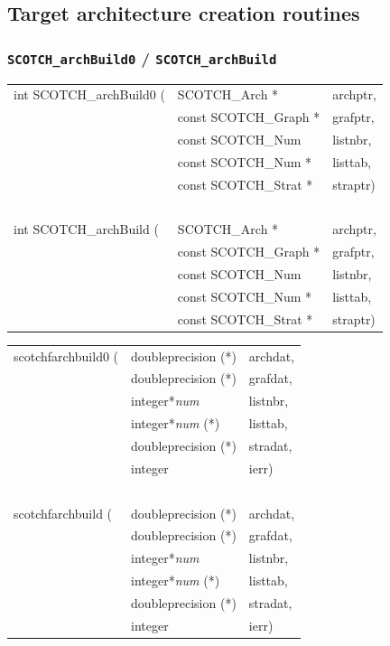 \subsection{Target architecture creation routines}
\label{sec-lib-arch-create}

\subsubsection{{\tt SCOTCH\_archBuild0} / {\tt SCOTCH\_archBuild}}
\label{sec-lib-arch-build}

\begin{itemize}
\progsyn

{\tt\begin{tabular}{l@{}ll}
int SCOTCH\_archBuild0 ( & SCOTCH\_Arch *        & archptr, \\
                         & const SCOTCH\_Graph * & grafptr, \\
                         & const SCOTCH\_Num     & listnbr, \\
                         & const SCOTCH\_Num *   & listtab, \\
                         & const SCOTCH\_Strat * & straptr) \\
~\\
int SCOTCH\_archBuild ( & SCOTCH\_Arch *        & archptr, \\
                        & const SCOTCH\_Graph * & grafptr, \\
                        & const SCOTCH\_Num     & listnbr, \\
                        & const SCOTCH\_Num *   & listtab, \\
                        & const SCOTCH\_Strat * & straptr)
\end{tabular}}

{\tt\begin{tabular}{l@{}ll}
scotchfarchbuild0 ( & doubleprecision (*)   & archdat, \\
                    & doubleprecision (*)   & grafdat, \\
                    & integer*{\it num}     & listnbr, \\
                    & integer*{\it num} (*) & listtab, \\
                    & doubleprecision (*)   & stradat, \\
                    & integer               & ierr) \\
~\\
scotchfarchbuild ( & doubleprecision (*)   & archdat, \\
                   & doubleprecision (*)   & grafdat, \\
                   & integer*{\it num}     & listnbr, \\
                   & integer*{\it num} (*) & listtab, \\
                   & doubleprecision (*)   & stradat, \\
                   & integer               & ierr)
\end{tabular}}


\end{itemize}
